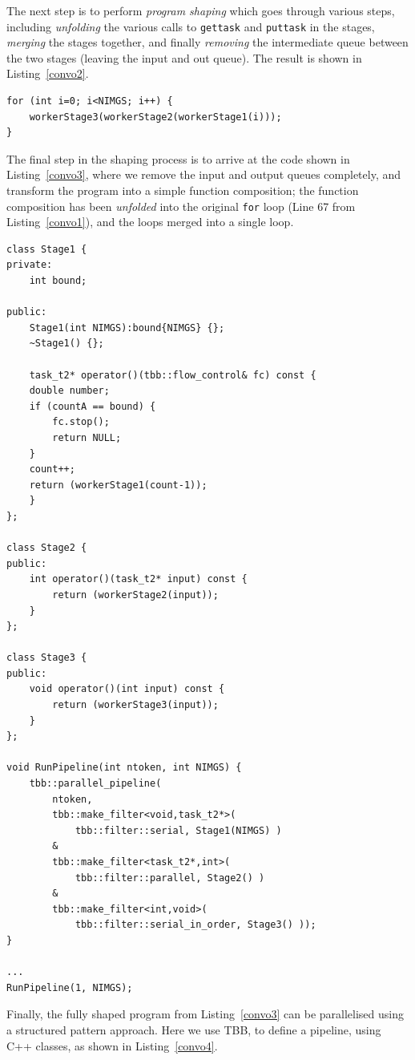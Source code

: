 The next step is to perform \emph{program shaping} which goes through various steps, including \emph{unfolding} the various calls to \lstinline{gettask} and \lstinline{puttask} in the stages, \emph{merging} the stages together, and finally \emph{removing} the intermediate queue between the two stages (leaving the input and out queue). The result is shown in Listing~\ref{convo2}.

\begin{lstlisting}[label=convo3,caption={Convolution Shaped}]
for (int i=0; i<NIMGS; i++) {
	workerStage3(workerStage2(workerStage1(i)));
}
\end{lstlisting}

The final step in the shaping process is to arrive at the code shown in Listing~\ref{convo3}, where we remove the input and output queues completely, and transform the program into a simple function composition; the function composition has been \emph{unfolded} into the original \lstinline{for} loop (Line 67 from Listing~\ref{convo1}), and the loops merged into a single loop. 


\begin{lstlisting}[label=convo4, caption={Convolution Restored with TBB}]
class Stage1 {
private:
	int bound;

public:
	Stage1(int NIMGS):bound{NIMGS} {};
	~Stage1() {};

	task_t2* operator()(tbb::flow_control& fc) const {
	double number;
	if (countA == bound) {
		fc.stop();
		return NULL;
	}
	count++;
	return (workerStage1(count-1));
	}
};

class Stage2 {
public:
	int operator()(task_t2* input) const {
		return (workerStage2(input));
	}
};

class Stage3 {
public:
	void operator()(int input) const {
		return (workerStage3(input));
	}
};

void RunPipeline(int ntoken, int NIMGS) {
	tbb::parallel_pipeline(
		ntoken,
		tbb::make_filter<void,task_t2*>(
			tbb::filter::serial, Stage1(NIMGS) )
		&
		tbb::make_filter<task_t2*,int>(
			tbb::filter::parallel, Stage2() )
		&
		tbb::make_filter<int,void>(
			tbb::filter::serial_in_order, Stage3() ));
}

...
RunPipeline(1, NIMGS);
\end{lstlisting}

Finally, the fully shaped program from Listing~\ref{convo3} can be parallelised using a structured pattern approach. Here we use TBB, to define a pipeline, using C++ classes, as shown in Listing~\ref{convo4}.

